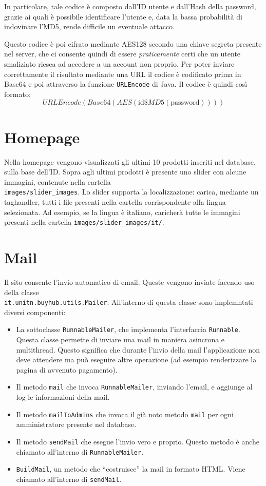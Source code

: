 In particolare, tale codice è composto dall'ID utente e dall'Hash della password, grazie ai quali è possibile identificare l'utente e, data la bassa probabilità di indovinare l'MD5, rende difficile un eventuale attacco.

Questo codice è poi cifrato mediante AES128 secondo una chiave segreta presente nel server, che ci consente quindi di essere \textit{praticamente} certi che un utente smaliziato riesca ad accedere a un account non proprio. Per poter inviare correttamente il risultato mediante una URL il codice è codificato prima in Base64 e poi attraverso la funzione \texttt{URLEncode} di Java. Il codice è quindi così formato:
\[
    URLEncode( Base64( AES( \mbox{id}\$MD5(\mbox{password}))))
\]

\chapter{Homepage}
Nella homepage vengono visualizzati gli ultimi 10 prodotti inseriti nel database, sulla base dell'ID. Sopra agli ultimi prodotti è presente uno slider con alcune immagini, contenute nella cartella \\\texttt{images/slider\_images}. Lo slider supporta la localizzazione: carica, mediante un taghandler, tutti i file presenti nella cartella corrispondente alla lingua selezionata. Ad esempio, se la lingua è italiano, caricherà tutte le immagini presenti nella cartella \texttt{images/slider\_images/it/}.


\chapter{Mail}
Il sito consente l'invio automatico di email. Queste vengono inviate facendo uso della classe \\\texttt{it.unitn.buyhub.utils.Mailer}.
All'interno di questa classe sono implemntati diversi componenti:
\begin{itemize}
  \item La sottoclasse \texttt{RunnableMailer}, che implementa l'interfaccia \texttt{Runnable}. Questa classe permette di inviare una mail in maniera asincrona e multithread. Questo significa che durante l'invio della mail l'applicazione non deve attendere ma può eseguire altre operazione (ad esempio renderizzare la pagina di avvenuto pagamento).
  \item Il metodo \texttt{mail} che invoca \texttt{RunnableMailer}, inviando l'email, e aggiunge al log le informazioni della mail.
  \item Il metodo \texttt{mailToAdmins} che invoca il già noto metodo \texttt{mail} per ogni amministratore presente nel database.
  \item Il metodo \texttt{sendMail} che esegue l'invio vero e proprio. Questo metodo è anche chiamato all'interno di \texttt{RunnableMailer}.
  \item \texttt{BuildMail}, un metodo che ``costruisce'' la mail in formato HTML. Viene chiamato all'interno di \texttt{sendMail}.
\end{itemize}


